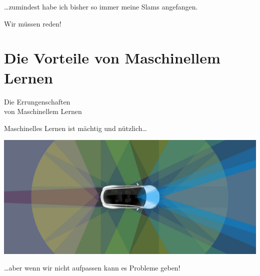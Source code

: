 \documentclass[aspectratio=169,x11names]{beamer}
\begin{document}

\begin{frame}

\begin{center}
\dots zumindest habe ich bisher so immer meine Slams angefangen.
\bigskip

Wir müssen reden!
\end{center}

\end{frame}

\section{Die Vorteile von Maschinellem Lernen}

\begin{frame}
\begin{center}
\huge
Die Errungenschaften\\von Maschinellem Lernen
\end{center}
\end{frame}

\begin{frame}

\begin{center}
Maschinelles Lernen ist mächtig und nützlich\dots
\end{center}

\begin{center}
\includegraphics[width=\textwidth]{images/autopilotnew.jpg} 
\end{center}

\begin{center}
\dots aber wenn wir nicht aufpassen kann es Probleme geben!
\end{center}
\end{frame}

\end{document}
